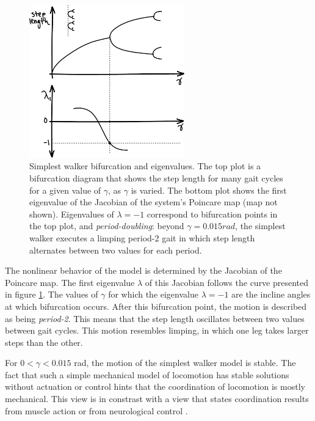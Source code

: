 \begin{figure}[h]		%
\begin{centering}
\includegraphics[width=0.6\textwidth]{Figures/SimplestWalkerEigenvalues}\par
\end{centering}
\caption[Plot: Simplest Walker Bifurcation and Eigenvalues]{Simplest walker bifurcation and eigenvalues. The top plot is a bifurcation diagram that shows the step length for many gait cycles for a given value of $\gamma$, as $\gamma$ is varied. The bottom plot shows the first eigenvalue of the Jacobian of the system's Poincare map (map not shown). Eigenvalues of $\lambda = -1$ correspond to bifurcation points in the top plot, and \emph{period-doubling}: beyond $\gamma = 0.015 rad$, the simplest walker executes a limping period-2 gait in which step length alternates between two values for each period.}
\label{fig:SimplestWalkerEigenvalues}
\end{figure}
%

The nonlinear behavior of the model is determined by the Jacobian of the Poincare map. The first eigenvalue $\lambda$ of this Jacobian follows the curve presented in figure \ref{fig:SimplestWalkerEigenvalues}. The values of $\gamma$ for which the eigenvalue $\lambda = -1$ are the incline angles at which bifurcation occurs. After this bifurcation point, the motion is described as being \textit{period-2}. This means that the step length oscillates between two values between gait cycles. This motion resembles limping, in which one leg takes larger steps than the other.

For $0 < \gamma < 0.015$ rad, the motion of the simplest walker model is stable. The fact that such a simple mechanical model of locomotion has stable solutions without actuation or control hints that the coordination of locomotion is mostly mechanical. This view is in constrast with a view that states coordination results from muscle action or from neurological control \cite{garcia97}.

